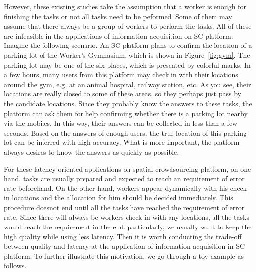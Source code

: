 However, these existing studies take the assumption that a worker is enough for finishing the tasks or 
not all tasks need to be peformed. Some of them may assume that there always be a group of workers to perform the tasks.
All of these are infeasible in the applications of information acquisition on SC platform.
Imagine the following scenario. 
An SC platform plans to confirm the location of a parking lot of the Worker's Gymnasium, which is shown in Figure~\ref{fig:gym}.
The parking lot may be one of the six places, which is presented by colorful marks.
In a few hours, many users from this platform may check in with their locations around the gym, e.g. at an animal hospital, railway station, etc.
As you see, their locations are really closed to some of these areas, so they perhaps just pass by the candidate locations.
Since they probably know the answers to these tasks, the platform can ask them for help confirming whether there is a parking lot nearby via the mobiles.
In this way, their answers can be collected in less than a few seconds.
Based on the answers of enough users, the true location of this parking lot can be inferred with high accuracy.
What is more important, the platform always desires to know the answers as quickly as possible.

For these latency-oriented applications on spatial crowdsourcing platform, on one hand, tasks are usually prepared 
and expected to reach an requirement of error rate beforehand.
On the other hand, workers appear dynamically with his check-in locations and the allocation for him should be decided immediately.
This procedure doesnot end until all the tasks have reached the requirement of error rate.
Since there will always be workers check in with any locations, all the tasks would reach the requirement in the end.
particularly, we usually want to keep the high quality while using less latency.
Then it is worth conducting the trade-off between quality and latency at the application of information acquisition in SC platform.
To further illustrate this motivation, we go through a toy example as follows.


